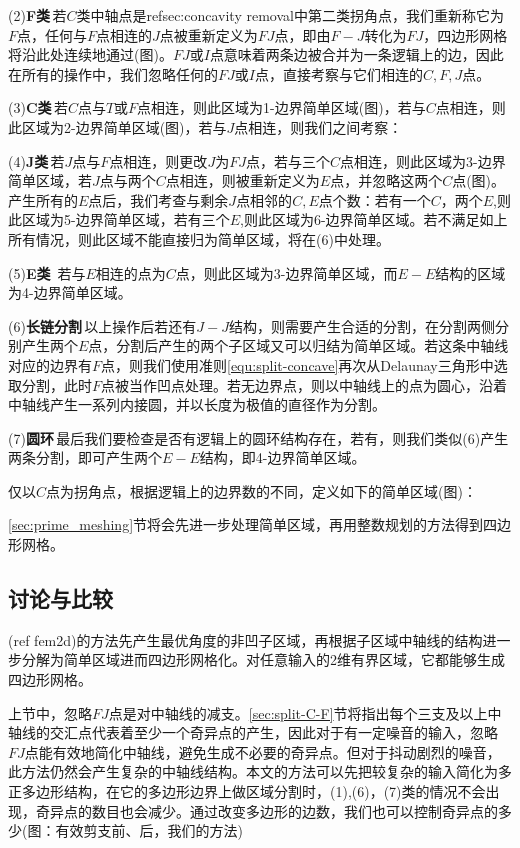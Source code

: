 (2)\textbf{F类}\,若$C$类中轴点是ref{sec:concavity removal}中第二类拐角点，我们重新称它为$F$点，任何与$F$点相连的$J$点被重新定义为$FJ$点，即由$F-J$转化为$FJ$，四边形网格将沿此处连续地通过(图)。$FJ$或$I$点意味着两条边被合并为一条逻辑上的边，因此在所有的操作中，我们忽略任何的$FJ$或$I$点，直接考察与它们相连的$C,F,J$点。

(3)\textbf{C类}\,若$C$点与$T$或$F$点相连，则此区域为1-边界简单区域(图)，若与$C$点相连，则此区域为2-边界简单区域(图)，若与$J$点相连，则我们之间考察：

(4)\textbf{J类}\,若$J$点与$F$点相连，则更改$J$为$FJ$点，若与三个$C$点相连，则此区域为3-边界简单区域，若$J$点与两个$C$点相连，则被重新定义为$E$点，并忽略这两个$C$点(图)。产生所有的$E$点后，我们考查与剩余$J$点相邻的$C,E$点个数：若有一个$C$，两个$E$,则此区域为5-边界简单区域，若有三个$E$,则此区域为6-边界简单区域。若不满足如上所有情况，则此区域不能直接归为简单区域，将在(6)中处理。

(5)\textbf{E类}\, 若与$E$相连的点为$C$点，则此区域为3-边界简单区域，而$E-E$结构的区域为4-边界简单区域。

(6)\textbf{长链分割}\,以上操作后若还有$J-J$结构，则需要产生合适的分割，在分割两侧分别产生两个$E$点，分割后产生的两个子区域又可以归结为简单区域。若这条中轴线对应的边界有$F$点，则我们使用准则\ref{equ:split-concave}再次从Delaunay三角形中选取分割，此时$F$点被当作凹点处理。若无边界点，则以中轴线上的点为圆心，沿着中轴线产生一系列内接圆，并以长度为极值的直径作为分割。

(7)\textbf{圆环}\,最后我们要检查是否有逻辑上的圆环结构存在，若有，则我们类似(6)产生两条分割，即可产生两个$E-E$结构，即4-边界简单区域。

\begin{definition}\label{def:prime}
	仅以$C$点为拐角点，根据逻辑上的边界数的不同，定义如下的简单区域(图)：
\end{definition}

\ref{sec:prime_meshing}节将会先进一步处理简单区域，再用整数规划的方法得到四边形网格。

\subsection{讨论与比较}\label{sec:discuss}

(ref fem2d)的方法先产生最优角度的非凹子区域，再根据子区域中轴线的结构进一步分解为简单区域进而四边形网格化。对任意输入的2维有界区域，它都能够生成四边形网格。

上节中，忽略$FJ$点是对中轴线的减支。\ref{sec:split-C-F}节将指出每个三支及以上中轴线的交汇点代表着至少一个奇异点的产生，因此对于有一定噪音的输入，忽略$FJ$点能有效地简化中轴线，避免生成不必要的奇异点。但对于抖动剧烈的噪音，此方法仍然会产生复杂的中轴线结构。本文的方法可以先把较复杂的输入简化为多正多边形结构，在它的多边形边界上做区域分割时，(1),(6)，(7)类的情况不会出现，奇异点的数目也会减少。通过改变多边形的边数，我们也可以控制奇异点的多少(图：有效剪支前、后，我们的方法)

